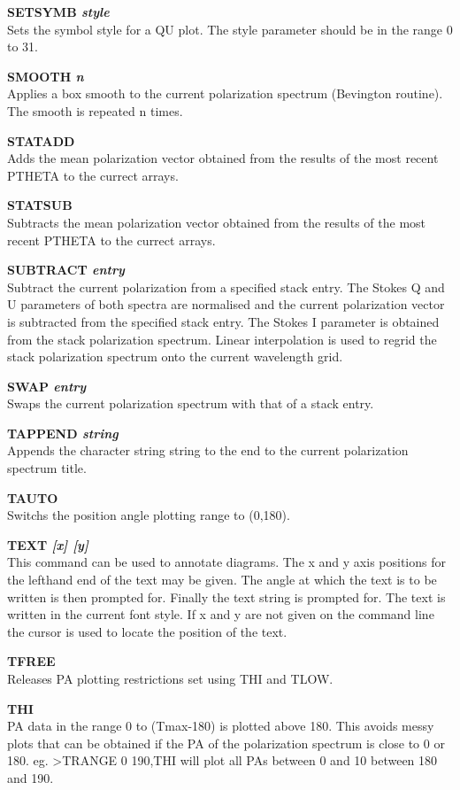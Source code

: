 {\bf SETSYMB \it  style} \\
Sets the symbol style for a QU plot. The style parameter should be in the 
range 0 to 31.

{\bf SMOOTH  \it n} \\
Applies a box smooth to the current polarization spectrum (Bevington
routine). The smooth is repeated n times.

{\bf STATADD} \\
Adds the mean polarization vector obtained from the results of the most recent
PTHETA to the currect arrays.

{\bf STATSUB} \\
Subtracts the mean polarization vector obtained from the results of
the most recent PTHETA to the currect arrays.

{\bf SUBTRACT \it  entry } \\
Subtract the current polarization from a specified stack entry. The Stokes Q
and U parameters of both spectra are normalised and the current polarization
vector is subtracted from the specified stack entry. The Stokes I parameter
is obtained from the stack polarization spectrum. Linear interpolation is used
to regrid the stack polarization spectrum onto the current wavelength grid.

{\bf SWAP \it  entry} \\
Swaps the current polarization spectrum with that of a stack entry.

{\bf TAPPEND \it string} \\
Appends the character string string to the end to the current polarization 
spectrum title.

{\bf TAUTO} \\
Switchs the position angle plotting range to (0,180).

{\bf TEXT \it  [x] [y]} \\
This command can be used to annotate diagrams. The x and y axis positions for
the lefthand end of the text may be given. The angle at which the text is
to be written is then prompted for. Finally the text string is prompted for.
The text is written in the current font style. If x and y are not given on
the command line the cursor is used to locate the position of the text.

{\bf TFREE} \\
Releases PA plotting restrictions set using THI and TLOW.

{\bf THI} \\
PA data in the range 0 to (Tmax-180) is plotted above 180. This avoids messy
plots that can be obtained if the PA of the polarization spectrum is close
to 0 or 180. eg. >TRANGE 0 190,THI will plot all PAs between 0 and 10 between
180 and 190.

